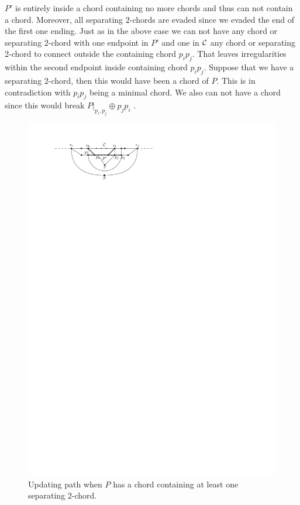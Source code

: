       $P'$ is entirely inside a chord containing no more chords and thus can not contain a chord. Moreover, all separating $2$-chords are evaded since we evaded the end of the first one ending.  Just as in the above case we can not have any chord or separating $2$-chord with one endpoint in $P'$ and one in $\mathcal{C}$ any chord or separating 2-chord to connect outside the containing chord $p_i p_j$.
      That leaves irregularities within the second endpoint inside containing chord $p_i p_j$. 
      Suppose that we have a separating $2$-chord, then this would have been a chord of $P$. This is in contradiction with $p_i p_j$ being a minimal chord.
      We also can not have a chord since this would break $P|_{p_i, p_j} \oplus p_j p_i$ .

      \begin{figure}[h]
        \centering
        \includegraphics[scale=1]{unifiedAlgo/img/sweep/cases/2chordInChordUpdate}
        \caption{Updating path when $P$ has a chord containing at least one separating 2-chord.}
        \label{fig:sweep:2chordInChordUpdate}
      \end{figure}

